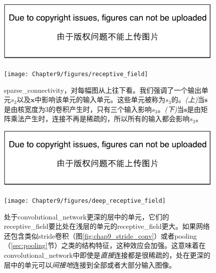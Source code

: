 \begin{figure}[!htb]
\ifOpenSource
\centerline{\includegraphics{figure.pdf}}
\else
\centerline{\texttt{[image: Chapter9/figures/receptive\_field]}}
\fi
\captionsetup{singlelinecheck=off}
\caption[Caption for LOF]{\gls{sparse_connectivity}，对每幅图从上往下看。我们强调了一个输出单元$s_3$以及$\bm{x}$中影响该单元的输入单元。这些单元被称为$s_3$的\protect\footnotemark。\emph{(上)}当$\bm{s}$是由核宽度为3的卷积产生时，只有三个输入影响$s_3$。\emph{(下)}当$\bm{s}$是由矩阵乘法产生时，连接不再是稀疏的，所以所有的输入都会影响$s_3$。}
\label{fig:chap9_receptive_field}
\end{figure}

\begin{figure}[!htb]
\ifOpenSource
\centerline{\includegraphics{figure.pdf}}
\else
\centerline{\texttt{[image: Chapter9/figures/deep\_receptive\_field]}}
\fi
\caption{处于\gls{convolutional_network}更深的层中的单元，它们的\gls{receptive_field}要比处在浅层的单元的\gls{receptive_field}更大。如果网络还包含类似\gls{stride}卷积（图\ref{fig:chap9_stride_conv}）或者\gls{pooling}（\ref{sec:pooling}节）之类的结构特征，这种效应会加强。这意味着在\gls{convolutional_network}中即使是\emph{直接}连接都是很稀疏的，处在更深的层中的单元可以\emph{间接地}连接到全部或者大部分输入图像。}
\label{fig:chap9_deep_receptive_field}
\end{figure}

 
